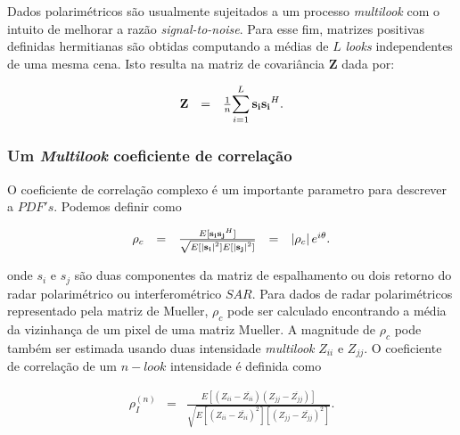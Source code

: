 \documentclass[10pt,a4paper]{article}
\begin{document}
Dados polarimétricos são usualmente sujeitados a um processo {\it multilook} com o intuito de melhorar a razão {\it signal-to-noise}. Para esse fim, matrizes positivas definidas hermitianas são obtidas computando a médias de $L$ {\it looks} independentes de uma mesma cena. Isto resulta na matriz de covariância {\bf Z} dada por:

\begin{equation}\label{sec1eqn7}
\begin{array}{ccc}
	{\bf Z}&=&\frac{1}{n}\displaystyle{\sum_{i=1}^{L} {\bf s_i}{\bf s_i}^H} . \\
\end{array}
\end{equation}

\subsubsection{Um {\it Multilook} coeficiente de correlação}

O coeficiente de correlação complexo é um importante parametro para descrever a $PDF's$. Podemos definir como

\begin{equation}\label{sec1eqn8}
\begin{array}{ccccc}
	\rho_c&=&\frac{E[{\bf s_i}{\bf s_j}^H]}{\sqrt{E[\left|{\bf s_i}\right|^2]E[\left|{\bf s_j}\right|^2]}} &=&\left|\rho_c\right|e^{i\theta}. \\
\end{array}
\end{equation}

onde {\bf $s_i$} e {\bf $s_j$} são duas componentes da matriz de espalhamento ou dois retorno do radar polarimétrico ou interferométrico $SAR$. Para dados de radar polarimétricos representado pela matriz de Mueller, $\rho_c$ pode ser calculado encontrando a média da vizinhança de um pixel de uma matriz Mueller. A magnitude de $\rho_c$ pode também ser estimada usando duas intensidade  {\it multilook} $Z_{ii}$ e $Z_{jj}$. O coeficiente de correlação de um $n-look$ intensidade é definida como   

\begin{equation}\label{sec1eqn9}
\begin{array}{ccc}
	\rho_I^{(n)}&=&\frac{E[(Z_{ii}-\overline{Z_{ii}})(Z_{jj}-\overline{Z_{jj}})]}{\sqrt{E[(Z_{ii}-\overline{Z_{ii}})^2][(Z_{jj}-\overline{Z_{jj}})^2]}}. \\
\end{array}
\end{equation}
\end{document}
